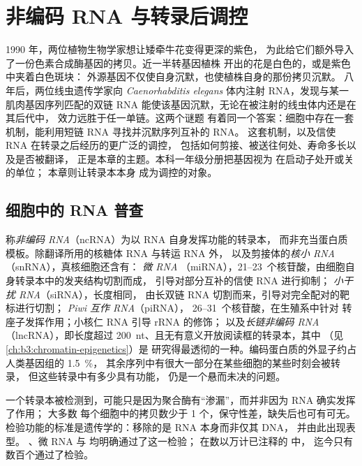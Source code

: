 \chapter{非编码 RNA 与转录后调控}\label{ch:b3:rna-regulation}

1990 年，两位植物生物学家想让矮牵牛花变得更深的紫色，
为此给它们额外导入了一份色素合成酶基因的拷贝。近一半转基因植株
开出的花是白色的，或是紫色中夹着白色斑块：
外源基因不仅使自身沉默，也使植株自身的那份拷贝沉默。
八年后，两位线虫遗传学家向
\emph{Caenorhabditis elegans} 体内注射 RNA，发现与某一肌肉基因序列匹配的双链 RNA
能使该基因沉默，无论在被注射的线虫体内还是在其后代中，
效力远胜于任一单链。这两个谜题
有着同一个答案：细胞中存在一套机制，能利用短链 RNA 寻找并沉默序列互补的 RNA。
这套机制，以及信使 RNA 在转录之后经历的更广泛的调控，
包括如何剪接、被送往何处、寿命多长以及是否被翻译，
正是本章的主题。本科一年级分册把基因视为
在启动子处开或关的单位；
本章则让转录本本身
成为调控的对象。

\section{细胞中的 RNA 普查}

\begin{definition}\label{def:b3:rna-regulation:ncrna}
称\emph{非编码 RNA}（ncRNA）为以 RNA 自身发挥功能的转录本，
而非充当蛋白质模板。除翻译所用的核糖体 RNA 与转运 RNA 外，
以及剪接体的\emph{核小 RNA}（snRNA），真核细胞还含有：
\emph{微 RNA}
（miRNA），\numrange{21}{23}~个核苷酸，由细胞自身转录本中的发夹结构切割而成，
引导对部分互补的信使 RNA 进行抑制；
\emph{小干扰 RNA}（siRNA），长度相同，
由长双链 RNA 切割而来，引导对完全配对的靶标进行切割；
\emph{Piwi 互作 RNA}（piRNA），
\numrange{26}{31}~个核苷酸，在生殖系中针对
转座子发挥作用；小核仁 RNA 引导 rRNA 的修饰；
以及\emph{长链非编码 RNA}（lncRNA），即长度超过
\qty{200}{nt}、且无有意义开放阅读框的转录本，其中
\emph{}（见\cref{ch:b3:chromatin-epigenetics}）是
研究得最透彻的一种。编码蛋白质的外显子约占人类基因组的 \qty{1.5}{\%}，
其余序列中有很大一部分在某些细胞的某些时刻会被转录，
但这些转录中有多少具有功能，
仍是一个悬而未决的问题。
\end{definition}

\begin{remark}[丰度不等于功能]\label{rem:b3:rna-regulation:function}
一个转录本被检测到，可能只是因为聚合酶有“渗漏”，而并非因为 RNA 确实发挥了作用；
大多数  每个细胞中的拷贝数少于 1 个，保守性差，缺失后也可有可无。
检验功能的标准是遗传学的：移除的是 RNA 本身而非仅其 DNA，
并由此出现表型。
\emph{}、微 RNA 与  均明确通过了这一检验；
在数以万计已注释的  中，
迄今只有数百个通过了检验。
\end{remark}

